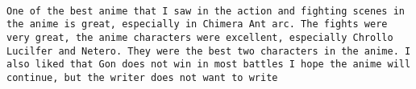 \documentclass[
]{article}
\begin{document}
\begin{verbatim}
                                                                                                                                                                                                                                                                                                                                                                                                                                                                                                                                                                                                                                                                                                                                                                                                                                                                                                                                                                                                                                                                                                                                                                                                                                                                                                                                           One of the best anime that I saw in the action and fighting scenes in the anime is great, especially in Chimera Ant arc. The fights were very great, the anime characters were excellent, especially Chrollo Lucilfer and Netero. They were the best two characters in the anime. I also liked that Gon does not win in most battles I hope the anime will continue, but the writer does not want to write

\end{verbatim}
\end{document}
